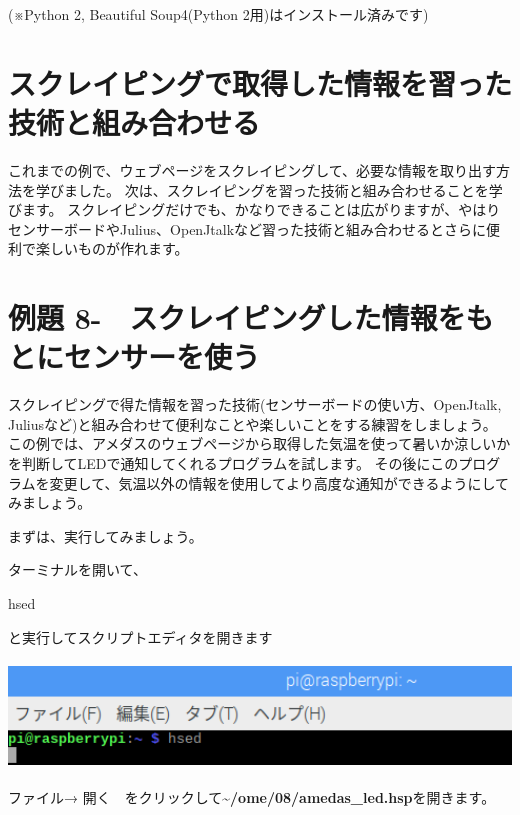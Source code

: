 \documentclass[a4paper,12pt,dvipdfmx]{jarticle}
\newcounter{Exercise}
\renewcommand\theExercise{例題 8-\arabic{Exercise}}
\begin{document}
(※Python 2, Beautiful Soup4(Python
2用)はインストール済みです)


\bigskip

\clearpage\section{スクレイピングで取得した情報を習った技術と組み合わせる}
これまでの例で、ウェブページをスクレイピングして、必要な情報を取り出す方法を学びました。
次は、スクレイピングを習った技術と組み合わせることを学びます。
スクレイピングだけでも、かなりできることは広がりますが、やはりセンサーボードやJulius、OpenJtalkなど習った技術と組み合わせるとさらに便利で楽しいものが作れます。

\clearpage\section{\theExercise　スクレイピングした情報をもとにセンサーを使う}
スクレイピングで得た情報を習った技術(センサーボードの使い方、OpenJtalk,
Juliusなど)と組み合わせて便利なことや楽しいことをする練習をしましょう。
この例では、アメダスのウェブページから取得した気温を使って暑いか涼しいかを判断してLEDで通知してくれるプログラムを試します。
その後にこのプログラムを変更して、気温以外の情報を使用してより高度な通知ができるようにしてみましょう。

まずは、実行してみましょう。

ターミナルを開いて、

hsed 

と実行してスクリプトエディタを開きます

\begin{center}
\includegraphics[width=17.057cm,height=2.866cm]{textbook-img013.png}

\end{center}
ファイル→
開く　をクリックして\textbf{\~{}/ome/08/amedas\_led.hsp}を開きます。
\end{document}
